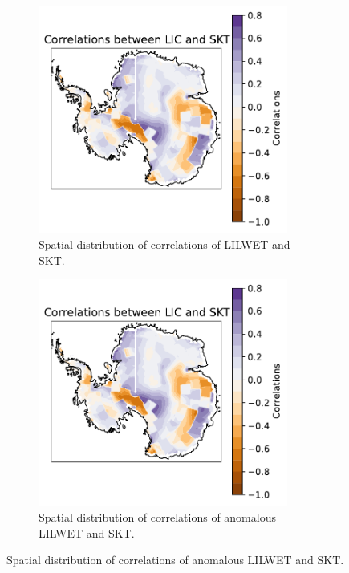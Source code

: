 \documentclass[../main.tex]{subfiles}
\begin{document}
\begin{figure}[h!]
\centering
\begin{subfigure}[h!]{0.49\textwidth}
\centering
\includegraphics[width=0.9\textwidth]{images/week8/hres/corr_lic_skt_shortterm_spatial}
\caption{Spatial distribution of correlations of LILWET and SKT.}
\end{subfigure}
\begin{subfigure}[h!]{0.49\textwidth}
\centering
\includegraphics[width=0.9\textwidth]{images/week8/hres/corr_lic_skt_shortterm_spatial_anmomalous}
\caption{Spatial distribution of correlations of anomalous LILWET and SKT.}

\end{subfigure}
\end{figure}
\end{document}
